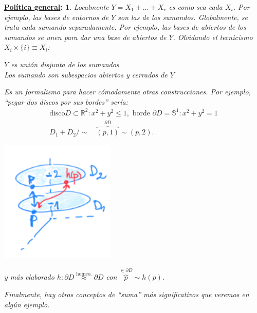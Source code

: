 \documentclass[10pt,a4paper,openright]{book}
\theoremstyle{break}
\newtheorem*{pg}{\underline{Política general}:}
\begin{document}
\begin{pg}
Localmente $Y = X_1 + \ldots + X_r$ es como sea cada $X_i$. Por ejemplo, las bases de entornos de $Y$ son las de los sumandos. Globalmente, se trata cada sumando separadamente. Por ejemplo, las bases de abiertos de los sumandos se unen para dar una base de abiertos de $Y$. Olvidando el tecnicismo $X_i \times \{i\} \equiv X_i$:
\begin{center}
   $Y$ es unión disjunta de los sumandos\\
   Los sumando son subespacios abiertos y cerrados de $Y$
\end{center}
Es un formalismo para hacer cómodamente otras construcciones. Por ejemplo, ``pegar dos discos por sus bordes'' sería:
\begin{gather*}
    \text{disco} D \subset \mathbb{R}^2: x^2 + y^2 \le 1, \text{ borde } \partial D = \mathbb{S}^1: x^2 + y^2 = 1\\
    D_1 + D_2 / \sim\quad \overbrace{\left( p, 1 \right)}^{\partial D} \sim \left( p, 2 \right) 
.\end{gather*}
\begin{center}    
    \includegraphics[scale=0.3]{images/pg_top_sum} 
\end{center}
y más elaborado $h: \partial D \stackrel{\text{homeo.}}{\approx} \partial D$ con $\overbrace{p}^{\in \partial D} \sim h\left( p \right)$.

Finalmente, hay otros conceptos de ``suma'' más significativos que veremos en algún ejemplo.
\end{pg}
\end{document}
